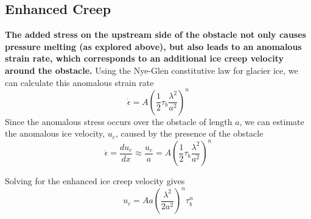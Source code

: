 \documentclass[12pt]{article}
\theoremstyle{definition}
\begin{document}
\subsection{Enhanced Creep}
\textbf{The added stress on the upstream side of the obstacle not only causes pressure melting (as explored above), but also leads to an anomalous strain rate, which corresponds to an additional ice creep velocity around the obstacle.} Using the Nye-Glen constitutive law for glacier ice, we can calculate this anomalous strain rate
\begin{equation}
\dot{\epsilon} = A \left(\frac{1}{2} \tau_b \frac{\lambda^2}{a^2} \right)^n
\end{equation}
Since the anomalous stress occurs over the obstacle of length $a$, we can estimate the anomalous ice velocity, $u_c$, caused by the presence of the obstacle
\begin{equation}
\dot{\epsilon} = \frac{du_c}{dx} \approx \frac{u_c}{a} = A \left(\frac{1}{2} \tau_b \frac{\lambda^2}{a^2} \right)^n
\end{equation}
\begin{shaded}
Solving for the enhanced ice creep velocity gives
\begin{equation}
u_c = A a \left(\frac{\lambda^2}{2 a^2} \right)^n \tau_b^n
\end{equation}
\end{shaded}
\end{document}
